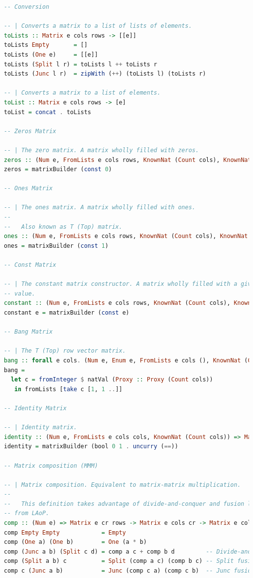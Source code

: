 \documentclass[
  oneside,
  11pt, a4paper,
  footinclude=true,
  headinclude=true,
  cleardoublepage=empty
]{scrbook}
\theoremstyle{definition}
\theoremstyle{definition}
\begin{document}
\begin{lstlisting}[language=Haskell, caption={Matrix.Internal},captionpos=b]
-- Conversion

-- | Converts a matrix to a list of lists of elements.
toLists :: Matrix e cols rows -> [[e]]
toLists Empty       = []
toLists (One e)     = [[e]]
toLists (Split l r) = toLists l ++ toLists r
toLists (Junc l r)  = zipWith (++) (toLists l) (toLists r)

-- | Converts a matrix to a list of elements.
toList :: Matrix e cols rows -> [e]
toList = concat . toLists

-- Zeros Matrix

-- | The zero matrix. A matrix wholly filled with zeros.
zeros :: (Num e, FromLists e cols rows, KnownNat (Count cols), KnownNat (Count rows)) => Matrix e cols rows
zeros = matrixBuilder (const 0)

-- Ones Matrix

-- | The ones matrix. A matrix wholly filled with ones.
--
--   Also known as T (Top) matrix.
ones :: (Num e, FromLists e cols rows, KnownNat (Count cols), KnownNat (Count rows)) => Matrix e cols rows
ones = matrixBuilder (const 1)

-- Const Matrix

-- | The constant matrix constructor. A matrix wholly filled with a given
-- value.
constant :: (Num e, FromLists e cols rows, KnownNat (Count cols), KnownNat (Count rows)) => e -> Matrix e cols rows
constant e = matrixBuilder (const e)

-- Bang Matrix

-- | The T (Top) row vector matrix.
bang :: forall e cols. (Num e, Enum e, FromLists e cols (), KnownNat (Count cols)) => Matrix e cols ()
bang =
  let c = fromInteger $ natVal (Proxy :: Proxy (Count cols))
   in fromLists [take c [1, 1 ..]]

-- Identity Matrix

-- | Identity matrix.
identity :: (Num e, FromLists e cols cols, KnownNat (Count cols)) => Matrix e cols cols
identity = matrixBuilder (bool 0 1 . uncurry (==))

-- Matrix composition (MMM)

-- | Matrix composition. Equivalent to matrix-matrix multiplication.
--
--   This definition takes advantage of divide-and-conquer and fusion laws
-- from LAoP.
comp :: (Num e) => Matrix e cr rows -> Matrix e cols cr -> Matrix e cols rows
comp Empty Empty            = Empty
comp (One a) (One b)        = One (a * b)
comp (Junc a b) (Split c d) = comp a c + comp b d         -- Divide-and-conquer law
comp (Split a b) c          = Split (comp a c) (comp b c) -- Split fusion law
comp c (Junc a b)           = Junc (comp c a) (comp c b)  -- Junc fusion law


\end{lstlisting}
\end{document}
